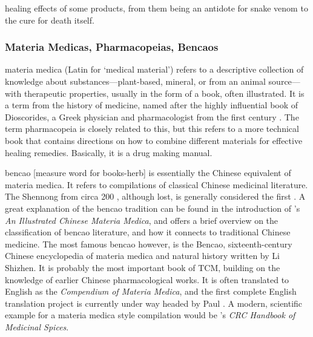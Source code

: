 healing effects of some products, from them being an antidote for snake venom to the cure for death itself.

\subsubsection{Materia Medicas, Pharmacopeias, Bencaos}

\Gls{materia medica} (Latin for `medical material') refers to a descriptive collection of knowledge about substances---plant-based, mineral, or from an animal source---with therapeutic properties, usually in the form of a book, often illustrated. It is a term from the history of medicine, named after the highly influential book of Dioscorides, a Greek physician and pharmacologist from the first century \AD{}. The term \gls{pharmacopeia} is closely related to this, but this refers to a more technical book that contains directions on how to combine different materials for effective healing remedies. Basically, it is a drug making manual.

\Gls{bencao}  [measure word for books-herb] is essentially the Chinese equivalent of materia medica. It refers to compilations of classical Chinese medicinal literature. The \gls{Shennong} from circa 200 \AD{}, although lost, is generally considered the first \autocites[see][]{nugent-head_first_2014}{yang_divine_1998}. A great explanation of the \gls{bencao} tradition can be found in the introduction of \textcite{wu_illustrated_2005}'s \textit{An Illustrated Chinese Materia Medica}, and \textcite{zhao_concise_2018} offers a brief overview on the classification of \gls{bencao} literature, and how it connects to traditional Chinese medicine. The most famous \gls{bencao} however, is the \gls{Bencao}, sixteenth-century Chinese encyclopedia of materia medica and natural history written by Li Shizhen. It is probably the most important book of \gls{TCM}, building on the knowledge of earlier Chinese pharmacological works. It is often translated to English as the \textit{Compendium of Materia Medica}, and the first complete English translation project is currently under way headed by Paul \textcite{unschuld_first_2022}. 
A modern, scientific example for a materia medica style compilation would be \textcite{duke_crc_2002}'s \textit{CRC Handbook of Medicinal Spices}.

